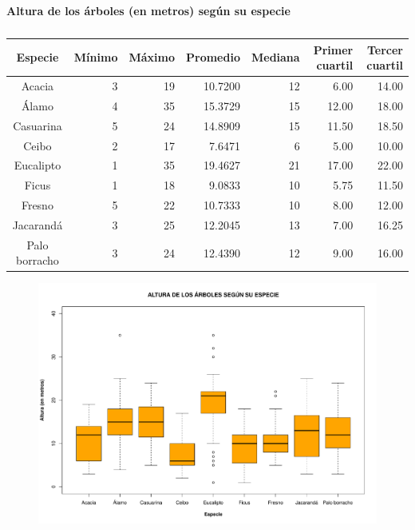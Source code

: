 \documentclass[11pt]{article}
\begin{document}
\begin{table}[h!]
  \begin{center}
    \caption*{\textbf{Altura de los árboles (en metros) según su especie}}
    \begin{tabular}{| c | r | r | r | r | r | r |}
      \hline
      \textbf{Especie} & \textbf{Mínimo} & \textbf{Máximo} & \textbf{Promedio} &
      \textbf{Mediana} & \textbf{Primer cuartil} & \textbf{Tercer cuartil}  \\ \hline
      Acacia & 3 & 19 & 10.7200 & 12 & 6.00 & 14.00 \\ \hline
	    Álamo & 4 & 35 & 15.3729 & 15 & 12.00 & 18.00 \\ \hline
	    Casuarina & 5 & 24 & 14.8909 & 15 & 11.50 & 18.50 \\ \hline
	    Ceibo & 2 & 17 & 7.6471 & 6 & 5.00 & 10.00 \\ \hline
	    Eucalipto & 1 & 35 & 19.4627 & 21 & 17.00 & 22.00 \\ \hline
	    Ficus & 1 & 18 & 9.0833 & 10 & 5.75 & 11.50 \\ \hline
	    Fresno & 5 & 22 & 10.7333 & 10 & 8.00 & 12.00 \\ \hline
	    Jacarandá & 3 & 25 & 12.2045 & 13 & 7.00 & 16.25 \\ \hline
	    Palo borracho & 3 & 24 & 12.4390 & 12 & 9.00 & 16.00 \\ \hline
    \end{tabular}
    \caption{}
    \label{tab:tablaAlturaEspecie}
  \end{center}
\end{table}

\begin{figure}[h!]
  \begin{center}
    \includegraphics[width=0.9\linewidth]{boxAlturaEspecie.pdf}
    \caption{}
    \label{fig:boxAlturaEspecie}
  \end{center}  
\end{figure}
\end{document}
